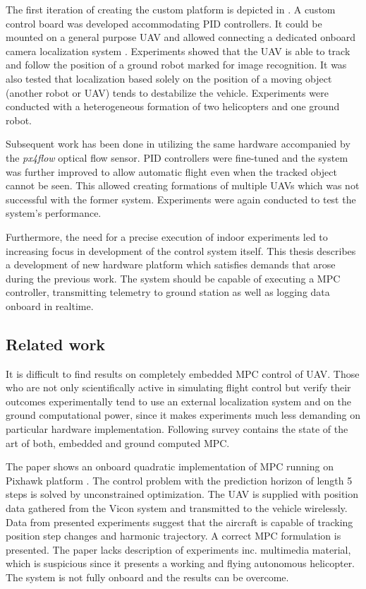The first iteration of creating the custom platform is depicted in \citep{baca2013}. A custom control board was developed accommodating PID controllers. It could be mounted on a general purpose UAV and allowed connecting a dedicated onboard camera localization system \citep{faigl2013low}. Experiments showed that the UAV is able to track and follow the position of a ground robot marked for image recognition. It was also tested that localization based solely on the position of a moving object (another robot or UAV) tends to destabilize the vehicle. Experiments were conducted with a heterogeneous formation of two helicopters and one ground robot.

Subsequent work has been done in \citep{endrych2014} utilizing the same hardware accompanied by the \textit{px4flow} optical flow sensor. PID controllers were fine-tuned and the system was further improved to allow automatic flight even when the tracked object cannot be seen. This allowed creating formations of multiple UAVs which was not successful with the former system. Experiments were again conducted to test the system's performance.

Furthermore, the need for a precise execution of indoor experiments led to increasing focus in development of the control system itself. This thesis describes a development of new hardware platform which satisfies demands that arose during the previous work. The system should be capable of executing a MPC controller, transmitting telemetry to ground station as well as logging data onboard in realtime. 

\subsection{Related work}

It is difficult to find results on completely embedded MPC control of UAV. Those who are not only scientifically active in simulating flight control but verify their outcomes experimentally tend to use an external localization system and on the ground computational power, since it makes experiments much less demanding on particular hardware implementation. Following survey contains the state of the art of both, embedded and ground computed MPC.

The paper \citep{bangura2014realtimempc} shows an onboard quadratic implementation of MPC running on Pixhawk platform \citep{pixhawk}. The control problem with the prediction horizon of length 5 steps is solved by unconstrained optimization. The UAV is supplied with position data gathered from the Vicon system and transmitted to the vehicle wirelessly. Data from presented experiments suggest that the aircraft is capable of tracking position step changes and harmonic trajectory. A correct MPC formulation is presented. The paper lacks description of experiments inc. multimedia material, which is suspicious since it presents a working and flying autonomous helicopter. The system is not fully onboard and the results can be overcome.

